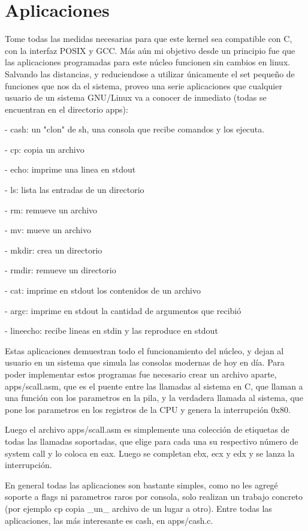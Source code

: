 \section{Aplicaciones}

Tome todas las medidas necesarias para que este kernel sea compatible con C,
con la interfaz POSIX y GCC. Más aún mi objetivo desde un principio fue que las
aplicaciones programadas para este núcleo funcionen sin cambios en linux.
Salvando las distancias, y reduciendose a utilizar únicamente el set pequeño
de funciones que nos da el sistema, proveo una serie aplicaciones que cualquier
usuario de un sistema GNU/Linux va a conocer de inmediato (todas se encuentran
en el directorio apps):

- cash: un "clon" de sh, una consola que recibe comandos y los ejecuta.

- cp: copia un archivo

- echo: imprime una linea en stdout

- ls: lista las entradas de un directorio

- rm: remueve un archivo

- mv: mueve un archivo

- mkdir: crea un directorio

- rmdir: remueve un directorio

- cat: imprime en stdout los contenidos de un archivo

- argc: imprime en stdout la cantidad de argumentos que recibió

- lineecho: recibe lineas en stdin y las reproduce en stdout

Estas aplicaciones demuestran todo el funcionamiento del núcleo, y dejan al
usuario en un sistema que simula las consolas modernas de hoy en día. Para
poder implementar estos programas fue necesario crear un archivo aparte,
apps/scall.asm, que es el puente entre las llamadas al sistema en C, que llaman
a una función con los parametros en la pila, y la verdadera llamada al sistema,
que pone los parametros en los registros de la CPU y genera la interrupción
0x80.

Luego el archivo apps/scall.asm es simplemente una colección de etiquetas de
todas las llamadas soportadas, que elige para cada una su respectivo número de
system call y lo coloca en eax. Luego se completan ebx, ecx y edx y se lanza la
interrupción.

En general todas las aplicaciones son bastante simples, como no les agregé
soporte a flags ni parametros raros por consola, solo realizan un trabajo
concreto (por ejemplo cp copia \_un\_ archivo de un lugar a otro). Entre todas
las aplicaciones, las más interesante es cash, en apps/cash.c.

